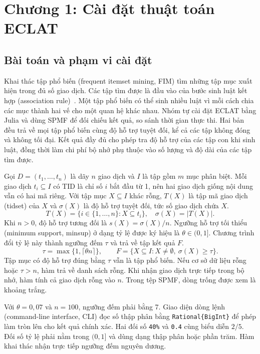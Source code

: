 \section{Chương 1: Cài đặt thuật toán ECLAT}
\label{sec:implementation}

\subsection{Bài toán và phạm vi cài đặt}
Khai thác tập phổ biến (frequent itemset mining, FIM) tìm những tập mục xuất
hiện trong đủ số giao dịch. Các tập tìm được là đầu vào của bước sinh luật
kết hợp (association rule)~\cite{agrawal1994}. Một tập phổ biến có thể sinh
nhiều luật vì mỗi cách chia các mục thành hai vế cho một quan hệ khác nhau.
Nhóm tự cài đặt ECLAT bằng Julia và dùng SPMF để đối chiếu kết quả, so sánh
thời gian thực thi. Hai bản đều trả về mọi tập phổ biến cùng độ hỗ trợ tuyệt
đối, kể cả các tập không đóng và không tối đại. Kết quả đầy đủ cho phép tra
độ hỗ trợ của các tập con khi sinh luật, đồng thời làm chi phí bộ nhớ phụ
thuộc vào số lượng và độ dài của các tập tìm được.

Gọi $D=(t_1,\ldots,t_n)$ là dãy $n$ giao dịch và $I$ là tập gồm $m$ mục
phân biệt. Mỗi giao dịch $t_i\subseteq I$ có TID là chỉ số $i$ bắt đầu từ 1,
nên hai giao dịch giống nội dung vẫn có hai mã riêng. Với tập mục
$X\subseteq I$ khác rỗng, $T(X)$ là tập mã giao dịch (tidset) của $X$ và
$\sigma(X)$ là độ hỗ trợ tuyệt đối, tức số giao dịch chứa $X$.
\begin{equation}
 T(X)=\{i\in\{1,\ldots,n\}:X\subseteq t_i\},\quad
 \sigma(X)=|T(X)|.
 \label{eq:support}
\end{equation}
Khi $n>0$, độ hỗ trợ tương đối là $s(X)=\sigma(X)/n$. Ngưỡng hỗ trợ tối thiểu
(minimum support, minsup) ở dạng tỷ lệ được ký hiệu là $\theta\in(0,1]$.
Chương trình đổi tỷ lệ này thành ngưỡng đếm $\tau$ và trả về tập kết quả $F$.
\begin{equation}
 \tau=\max\{1,\lceil\theta n\rceil\},\qquad
 F=\{X\subseteq I:X\ne\emptyset,\ \sigma(X)\ge\tau\}.
 \label{eq:threshold}
\end{equation}
Tập mục có độ hỗ trợ đúng bằng $\tau$ vẫn là tập phổ biến. Nếu cơ sở dữ liệu
rỗng hoặc $\tau>n$, hàm trả về danh sách rỗng. Khi nhận giao dịch trực tiếp
trong bộ nhớ, hàm tính cả giao dịch rỗng vào $n$. Trong tệp SPMF, dòng trống
được xem là khoảng trắng.

Với $\theta=0{,}07$ và $n=100$, ngưỡng đếm phải bằng 7. Giao diện dòng lệnh
(command-line interface, CLI) đọc số thập phân bằng
\texttt{Rational\{BigInt\}} để phép làm tròn lên cho kết quả chính xác.
Hai đối số \texttt{40\%} và \texttt{0.4} cùng biểu diễn $2/5$. Đối số tỷ lệ
phải nằm trong $(0,1]$ và dùng dạng thập phân hoặc phần trăm. Hàm khai thác
nhận trực tiếp ngưỡng đếm nguyên dương.

